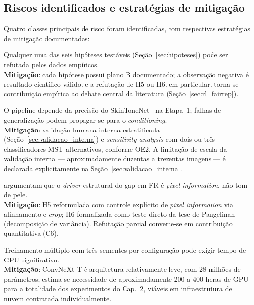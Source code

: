 \subsection{Riscos identificados e estratégias de mitigação}
\label{sec:riscos}

Quatro classes principais de risco foram identificadas, com respectivas estratégias de mitigação documentadas:

\begin{description}[font=\bfseries\sffamily]
\item[Risco~1 --- Refutação de hipóteses.] Qualquer uma das seis hipóteses testáveis (Seção~\ref{sec:hipoteses}) pode ser refutada pelos dados empíricos. \\
\textbf{Mitigação}: cada hipótese possui plano B documentado; a observação negativa é resultado científico válido, e a refutação de H5 ou H6, em particular, torna-se contribuição empírica ao debate central da literatura (Seção~\ref{sec:rl_fairrep}).

\item[Risco~2 --- Dependência do SkinToneNet como oráculo.] O pipeline depende da precisão do SkinToneNet~\cite{matias2026large} na Etapa~1; falhas de generalização podem propagar-se para o \emph{conditioning}. \\
\textbf{Mitigação}: validação humana interna estratificada (Seção~\ref{sec:validacao_interna}) e \emph{sensitivity analysis} com dois ou três classificadores MST alternativos, conforme OE2. A limitação de escala da validação interna --- aproximadamente duzentas a trezentas imagens --- é declarada explicitamente na Seção~\ref{sec:validacao_interna}.

\item[Risco~3 --- Refutação parcial por \emph{pixel information}.]  argumentam que o \emph{driver} estrutural do gap em FR é \emph{pixel information}, não tom de pele. \\
\textbf{Mitigação}: H5 reformulada com controle explícito de \emph{pixel information} via alinhamento e \emph{crop}; H6 formalizada como teste direto da tese de Pangelinan (decomposição de variância). Refutação parcial converte-se em contribuição quantitativa (C6).

\item[Risco~4 --- Limitação computacional.] Treinamento múltiplo com três sementes por configuração pode exigir tempo de GPU significativo. \\
\textbf{Mitigação}: ConvNeXt-T é arquitetura relativamente leve, com 28 milhões de parâmetros; estima-se necessidade de aproximadamente 200 a 400 horas de GPU para a totalidade dos experimentos do Cap.~2, viáveis em infraestrutura de nuvem contratada individualmente.
\end{description}

